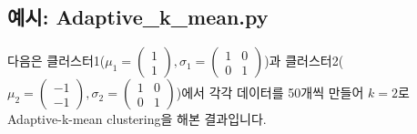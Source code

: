 \documentclass{oblivoir}
\begin{document}
  \subsection{예시: Adaptive\_k\_mean.py}
  다음은 클러스터1($\mu_1=\begin{pmatrix}1\\1\end{pmatrix},\sigma_1=\begin{pmatrix}1&0\\0&1\end{pmatrix}$)과
  클러스터2($\mu_2=\begin{pmatrix}-1\\-1\end{pmatrix},\sigma_2=\begin{pmatrix}1&0\\0&1\end{pmatrix}$)에서
  각각 데이터를 50개씩 만들어 $k=2$로 Adaptive-k-mean clustering을 해본 결과입니다.
\end{document}
